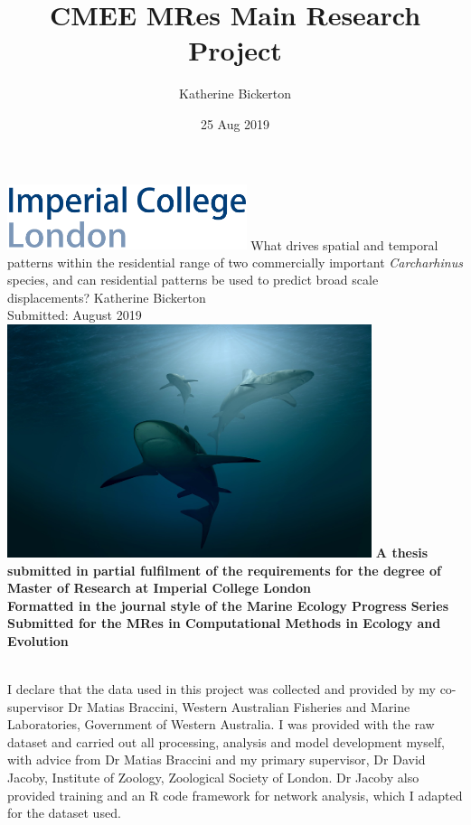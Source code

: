 \documentclass[11pt,a4paper]{article}
\title{CMEE MRes Main Research Project}
\date{25 Aug 2019}
\author{Katherine Bickerton}
\begin{document}
	
	\begin{titlepage}
		\centering
		\includegraphics[width = 7cm,left]{../Results/imperial_logo.png}
		{\Large
			\vskip2cm
			What drives spatial and temporal patterns within the residential range of two commercially important \textit{Carcharhinus} species, and can residential patterns be used to predict broad scale displacements?
		}    
		\vskip1cm	
		{\large Katherine Bickerton\\
		Submitted: August 2019}
		\vskip2cm	
		\includegraphics[width = 0.8\textwidth]{../Results/cover_image.jpg}
		\vskip3cm		
		\textbf{A thesis submitted in partial fulfilment of the requirements for the degree of Master of Research at Imperial College London\\
		Formatted in the journal style of the Marine Ecology Progress Series\\
		Submitted for the MRes in Computational Methods in Ecology and Evolution\\}
		\vspace*{\fill}
		\vspace*{\fill}
	\end{titlepage}
	
	
	\newpage
	
	\\
	
	\noindent
	I declare that the data used in this project was collected and provided by my co-supervisor Dr Matias Braccini, Western Australian Fisheries and Marine Laboratories, Government of Western Australia. I was provided with the raw dataset and carried out all processing, analysis and model development myself, with advice from Dr Matias Braccini and my primary supervisor, Dr David Jacoby, Institute of Zoology, Zoological Society of London. Dr Jacoby also provided training and an R code framework for network analysis, which I adapted for the dataset used.
	
\end{document}
